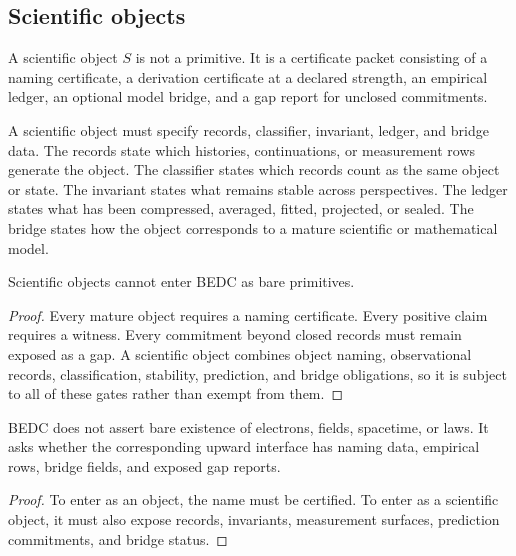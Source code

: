 \subsection{Scientific objects}
\label{subsec:philosophy-scientific-objects}

\begin{definition}
\label{def:philosophy-scientific-object}
A scientific object \(S\) is not a primitive. It is a certificate
packet consisting of a naming certificate, a derivation certificate at
a declared strength, an empirical ledger, an optional model bridge, and
a gap report for unclosed commitments.
\end{definition}

\begin{definition}
\label{def:philosophy-scientific-object-five-sources}
A scientific object must specify records, classifier, invariant,
ledger, and bridge data. The records state which histories,
continuations, or measurement rows generate the object. The classifier
states which records count as the same object or state. The invariant
states what remains stable across perspectives. The ledger states what
has been compressed, averaged, fitted, projected, or sealed. The bridge
states how the object corresponds to a mature scientific or
mathematical model.
\end{definition}

\begin{theorem}
\label{thm:philosophy-scientific-objects-not-primitives}
Scientific objects cannot enter BEDC as bare primitives.
\end{theorem}
\begin{proof}
Every mature object requires a naming certificate. Every positive
claim requires a witness. Every commitment beyond closed records must
remain exposed as a gap. A scientific object combines object naming,
observational records, classification, stability, prediction, and
bridge obligations, so it is subject to all of these gates rather than
exempt from them.
\end{proof}

\begin{corollary}
\label{cor:philosophy-scientific-realism-audited-entry}
BEDC does not assert bare existence of electrons, fields, spacetime,
or laws. It asks whether the corresponding upward interface has naming
data, empirical rows, bridge fields, and exposed gap reports.
\end{corollary}
\begin{proof}
To enter as an object, the name must be certified. To enter as a
scientific object, it must also expose records, invariants,
measurement surfaces, prediction commitments, and bridge status.
\end{proof}


